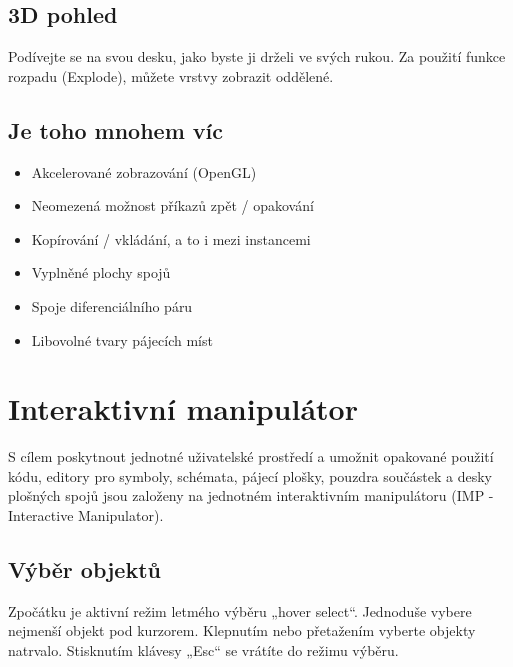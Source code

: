 \documentclass[letterpaper,10pt,czech]{sphinxmanual}
\begin{document}
\section{3D pohled}
\label{\detokenize{feature-overview:d-pohled}}
Podívejte se na svou desku, jako byste ji drželi ve svých rukou. Za použití funkce rozpadu (Explode), můžete vrstvy zobrazit oddělené.

\noindent{}


\section{Je toho mnohem víc}
\label{\detokenize{feature-overview:je-toho-mnohem-vic}}\begin{itemize}
\item {} 
Akcelerované zobrazování (OpenGL)

\item {} 
Neomezená možnost příkazů zpět / opakování

\item {} 
Kopírování / vkládání, a to i mezi instancemi

\item {} 
Vyplněné plochy spojů

\item {} 
Spoje diferenciálního páru

\item {} 
Libovolné tvary pájecích míst

\end{itemize}


\chapter{Interaktivní manipulátor}
\label{\detokenize{imp:interaktivni-manipulator}}\label{\detokenize{imp::doc}}
S cílem poskytnout jednotné uživatelské prostředí a umožnit opakované použití kódu,
editory pro symboly, schémata, pájecí plošky, pouzdra součástek a desky plošných spojů jsou založeny na jednotném interaktivním manipulátoru (IMP - Interactive Manipulator).


\section{Výběr objektů}
\label{\detokenize{imp:vyber-objektu}}
Zpočátku je aktivní režim letmého výběru „hover select“. Jednoduše vybere
nejmenší objekt pod kurzorem. Klepnutím nebo přetažením vyberte objekty
natrvalo. Stisknutím klávesy „Esc“ se vrátíte do režimu výběru.
\end{document}
